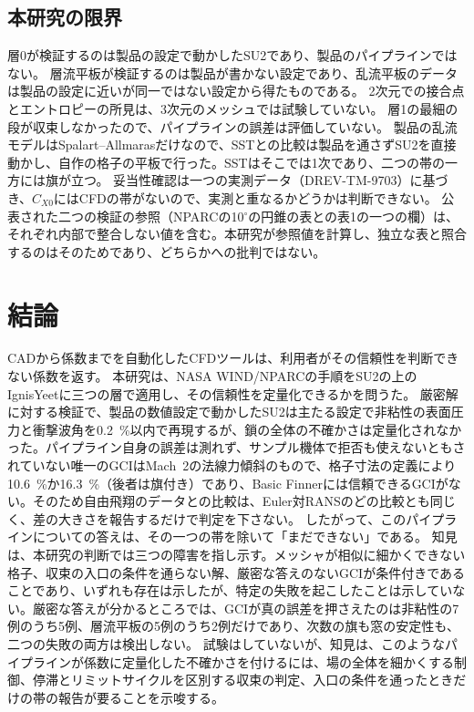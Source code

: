 \documentclass[twocolumn]{labreport}
\newcommand{\CXzero}{C_{X0}}
\begin{document}
\subsection{本研究の限界}
\label{sec:limits}

層0が検証するのは製品の設定で動かしたSU2であり、製品のパイプラインではない。
層流平板が検証するのは製品が書かない設定であり、乱流平板のデータは製品の設定に近いが同一ではない設定から得たものである。
2次元での接合点とエントロピーの所見は、3次元のメッシュでは試験していない。
層1の最細の段が収束しなかったので、パイプラインの誤差は評価していない。
製品の乱流モデルはSpalart--Allmarasだけなので、SSTとの比較は製品を通さずSU2を直接動かし、自作の格子の平板で行った。SSTはそこでは1次であり、二つの帯の一方には旗が立つ。
妥当性確認は一つの実測データ（DREV-TM-9703）に基づき、$\CXzero$にはCFDの帯がないので、実測と重なるかどうかは判断できない。
公表された二つの検証の参照（NPARCの10$^\circ$の円錐の表と\citet{celik2008}の表1の一つの欄）は、それぞれ内部で整合しない値を含む。本研究が参照値を計算し、独立な表と照合するのはそのためであり、どちらかへの批判ではない。

\section{結論}
\label{sec:conclusions}

CADから係数までを自動化したCFDツールは、利用者がその信頼性を判断できない係数を返す。
本研究は、NASA WIND/NPARCの手順をSU2の上のIgnisYeetに三つの層で適用し、その信頼性を定量化できるかを問うた。
厳密解に対する検証で、製品の数値設定で動かしたSU2は主たる設定で非粘性の表面圧力と衝撃波角を0.2~\%以内で再現するが、鎖の全体の不確かさは定量化されなかった。パイプライン自身の誤差は測れず、サンプル機体で拒否も使えないともされていない唯一のGCIはMach~2の法線力傾斜のもので、格子寸法の定義により10.6~\%か16.3~\%（後者は旗付き）であり、Basic Finnerには信頼できるGCIがない。そのため自由飛翔のデータとの比較は、Euler対RANSのどの比較とも同じく、差の大きさを報告するだけで判定を下さない。
したがって、このパイプラインについての答えは、その一つの帯を除いて「まだできない」である。
知見は、本研究の判断では三つの障害を指し示す。メッシャが相似に細かくできない格子、収束の入口の条件を通らない解、厳密な答えのないGCIが条件付きであることであり、いずれも存在は示したが、特定の失敗を起こしたことは示していない。厳密な答えが分かるところでは、GCIが真の誤差を押さえたのは非粘性の7例のうち5例、層流平板の5例のうち2例だけであり、次数の旗も窓の安定性も、二つの失敗の両方は検出しない。
試験はしていないが、知見は、このようなパイプラインが係数に定量化した不確かさを付けるには、場の全体を細かくする制御、停滞とリミットサイクルを区別する収束の判定、入口の条件を通ったときだけの帯の報告が要ることを示唆する。
\end{document}
